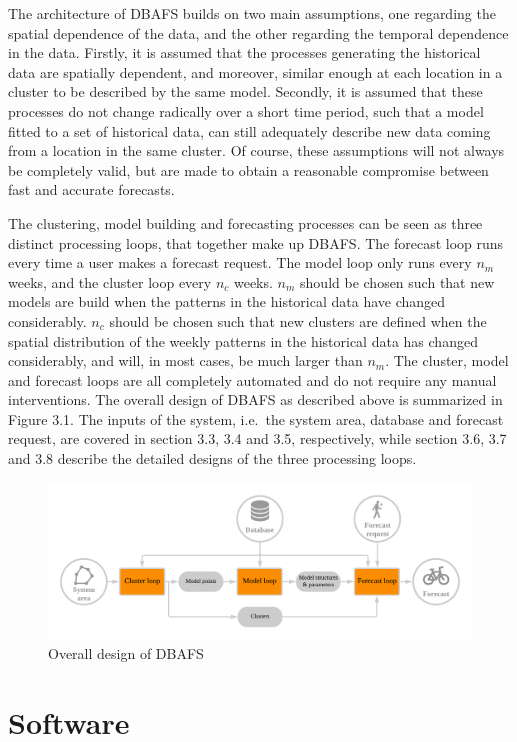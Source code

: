 \documentclass[12pt,oneside]{reedthesis}
\begin{document}
The architecture of DBAFS builds on two main assumptions, one regarding
the spatial dependence of the data, and the other regarding the temporal
dependence in the data. Firstly, it is assumed that the processes
generating the historical data are spatially dependent, and moreover,
similar enough at each location in a cluster to be described by the same
model. Secondly, it is assumed that these processes do not change
radically over a short time period, such that a model fitted to a set of
historical data, can still adequately describe new data coming from a
location in the same cluster. Of course, these assumptions will not
always be completely valid, but are made to obtain a reasonable
compromise between fast and accurate forecasts.

The clustering, model building and forecasting processes can be seen as
three distinct processing loops, that together make up DBAFS. The
forecast loop runs every time a user makes a forecast request. The model
loop only runs every \(n_{m}\) weeks, and the cluster loop every
\(n_{c}\) weeks. \(n_{m}\) should be chosen such that new models are
build when the patterns in the historical data have changed
considerably. \(n_{c}\) should be chosen such that new clusters are
defined when the spatial distribution of the weekly patterns in the
historical data has changed considerably, and will, in most cases, be
much larger than \(n_{m}\). The cluster, model and forecast loops are
all completely automated and do not require any manual interventions.
The overall design of DBAFS as described above is summarized in Figure
3.1. The inputs of the system, i.e.~the system area, database and
forecast request, are covered in section 3.3, 3.4 and 3.5, respectively,
while section 3.6, 3.7 and 3.8 describe the detailed designs of the
three processing loops.
\begin{figure}[h]
\includegraphics[width=\textwidth]{Figures/Workflow} \caption{Overall design of DBAFS}\label{fig:overalldesign}
\end{figure}
\section{Software}\label{software}
\end{document}
